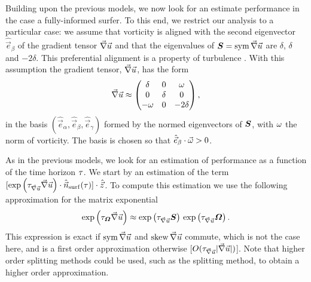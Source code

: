 Building upon the previous models, we now look for an estimate performance in the case a fully-informed surfer.
To this end, we restrict our analysis to a particular case: we assume that vorticity is aligned with the second eigenvector $\hat{\vec{e}}_\beta$ of the gradient tensor $\vec{\nabla} \vec{u}$ and that the eigenvalues of $\boldsymbol{S} = \operatorname{sym} \vec{\nabla} \vec{u}$ are $\delta$, $\delta$ and $-2\delta$.
This preferential alignment is a property of turbulence \citep{ashurst1987alignment, tsinober1992experimental, gulitski2007velocity}.
With this assumption the gradient tensor, $\vec{\nabla} \vec{u}$, has the form
\begin{equation}\label{turb:eq:gradient_tensor_model}
	\vec{\nabla} \vec{u} \approx \begin{pmatrix}
		\delta & 0 & \omega\\
		0 & \delta & 0\\
		-\omega & 0 & -2\delta
	\end{pmatrix},
\end{equation}
in the basis $(\hat{\vec{e}}_\alpha, \hat{\vec{e}}_\beta, \hat{\vec{e}}_\gamma)$ formed by the normed eigenvectors of $\boldsymbol{S}$, with $\omega$ the norm of vorticity.
The basis is chosen so that $\hat{\vec{e}}_\beta \cdot \vec{\omega} > 0$.

As in the previous models, we look for an estimation of performance as a function of the time horizon $\tau$.
We start by an estimation of the term $[ \exp \left( \tau_{\vec{\nabla} \vec{u}} \vec{\nabla} \vec{u} \right) \cdot \hat{\vec{n}}_{\mathrm{surf}}(\tau)] \cdot \hat{\vec{z}}$.
To compute this estimation  we use the following approximation for the matrix exponential
\begin{equation}\label{turb:eq:splitting}
	\exp \left( \tau_{\boldsymbol{\varOmega}} \vec{\nabla} \vec{u} \right) \approx \exp \left( \tau_{\vec{\nabla} \vec{u}} \boldsymbol{S} \right) \, \exp \left( \tau_{\vec{\nabla} \vec{u}} \boldsymbol{\varOmega} \right).
\end{equation}
This expression is exact if $\operatorname{sym} \vec{\nabla} \vec{u}$ and $\operatorname{skew} \vec{\nabla} \vec{u}$ commute, which is not the case here, and is a first order approximation otherwise [$O(\tau_{\vec{\nabla} \vec{u}} \lvert \vec{\nabla} \vec{u}\rvert)$].
Note that higher order splitting methods could be used, such as the \citet{strang1968construction} splitting method, to obtain a higher order approximation.

